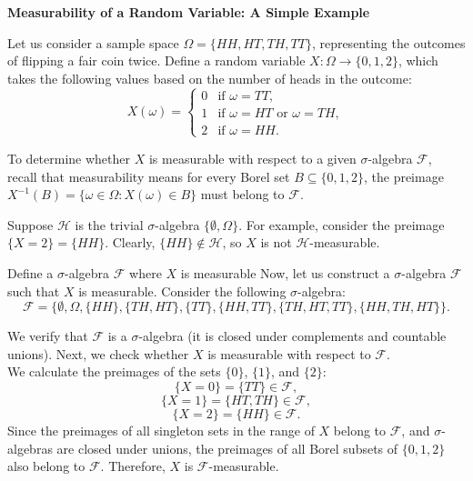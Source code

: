 \documentclass{article}
\begin{document}
\begin{example}
    \textbf{Measurability of a Random Variable: A Simple Example}
    
    Let us consider a sample space \(\Omega = \{HH, HT, TH, TT\}\), representing the outcomes of flipping a fair coin twice. Define a random variable \(X: \Omega \to \{0, 1, 2\}\), which takes the following values based on the number of heads in the outcome:
    \[
    X(\omega) = \begin{cases} 
    0 & \text{if } \omega = TT, \\
    1 & \text{if } \omega = HT \text{ or } \omega = TH, \\
    2 & \text{if } \omega = HH.
    \end{cases}
    \]
    
    To determine whether \(X\) is measurable with respect to a given \(\sigma\)-algebra \(\mathcal{F}\), recall that measurability means for every Borel set \(B \subseteq \{0, 1, 2\}\), the preimage \(X^{-1}(B) = \{\omega \in \Omega : X(\omega) \in B\}\) must belong to \(\mathcal{F}\).
    
    
    Suppose \(\mathcal{H}\) is the trivial \(\sigma\)-algebra \(\{\emptyset, \Omega\}\). For example, consider the preimage \(\{X = 2\} = \{HH\}\). Clearly, \(\{HH\} \notin \mathcal{H}\), so \(X\) is not \(\mathcal{H}\)-measurable.
    
Define a \(\sigma\)-algebra \(\mathcal{F}\) where \(X\) is measurable
    Now, let us construct a \(\sigma\)-algebra \(\mathcal{F}\) such that \(X\) is measurable. Consider the following \(\sigma\)-algebra:
    \[
    \mathcal{F} = \{\emptyset, \Omega, \{HH\}, \{TH, HT\}, \{TT\}, \{HH, TT\}, \{TH, HT, TT\}, \{HH, TH, HT\}\}.
    \]
    
    We verify that \(\mathcal{F}\) is a \(\sigma\)-algebra (it is closed under complements and countable unions). Next, we check whether \(X\) is measurable with respect to \(\mathcal{F}\).\\
    
   
    We calculate the preimages of the sets \(\{0\}\), \(\{1\}\), and \(\{2\}\):
    \[
    \{X = 0\} = \{TT\} \in \mathcal{F},
    \]
    \[
    \{X = 1\} = \{HT, TH\} \in \mathcal{F},
    \]
    \[
    \{X = 2\} = \{HH\} \in \mathcal{F}.
    \]
    Since the preimages of all singleton sets in the range of \(X\) belong to \(\mathcal{F}\), and \(\sigma\)-algebras are closed under unions, the preimages of all Borel subsets of \(\{0, 1, 2\}\) also belong to \(\mathcal{F}\). Therefore, \(X\) is \(\mathcal{F}\)-measurable. \\

    \end{example}
    
\end{document}

